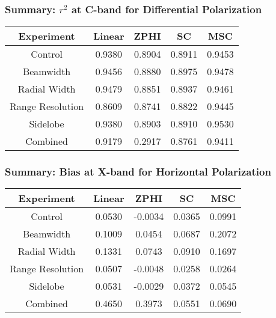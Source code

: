 \begin{frame}
    \frametitle{Summary: $r^2$ at C-band for Differential Polarization}
    \begin{center}
        \begin{tabular}{| c | c | c | c | c |}
            \hline
            Experiment & Linear & ZPHI & SC & MSC \\
            \hline
            \hline
            Control & 0.9380 & 0.8904 & 0.8911 & 0.9453 \\
            Beamwidth & 0.9456 & 0.8880 & 0.8975 & 0.9478 \\
            Radial Width & 0.9479 & 0.8851 & 0.8937 & 0.9461 \\
            Range Resolution & 0.8609 & 0.8741 & 0.8822 & 0.9445 \\
            Sidelobe & 0.9380 & 0.8903 & 0.8910 & 0.9530 \\
            Combined & 0.9179 & 0.2917 & 0.8761 & 0.9411 \\
            \hline
        \end{tabular}
    \end{center}
\end{frame}

\begin{frame}
    \frametitle{Summary: Bias at X-band for Horizontal Polarization}
    \begin{center}
        \begin{tabular}{| c | c | c | c | c |}
            \hline
            Experiment & Linear & ZPHI & SC & MSC \\
            \hline
            \hline
            Control & 0.0530 & -0.0034 & 0.0365 & 0.0991 \\
            Beamwidth & 0.1009 & 0.0454 & 0.0687 & 0.2072 \\
            Radial Width & 0.1331 & 0.0743 & 0.0910 & 0.1697 \\
            Range Resolution & 0.0507 & -0.0048 & 0.0258 & 0.0264 \\
            Sidelobe & 0.0531 & -0.0029 & 0.0372 & 0.0545 \\
            Combined & 0.4650 & 0.3973 & 0.0551 & 0.0690 \\
            \hline
        \end{tabular}
    \end{center}
\end{frame}

